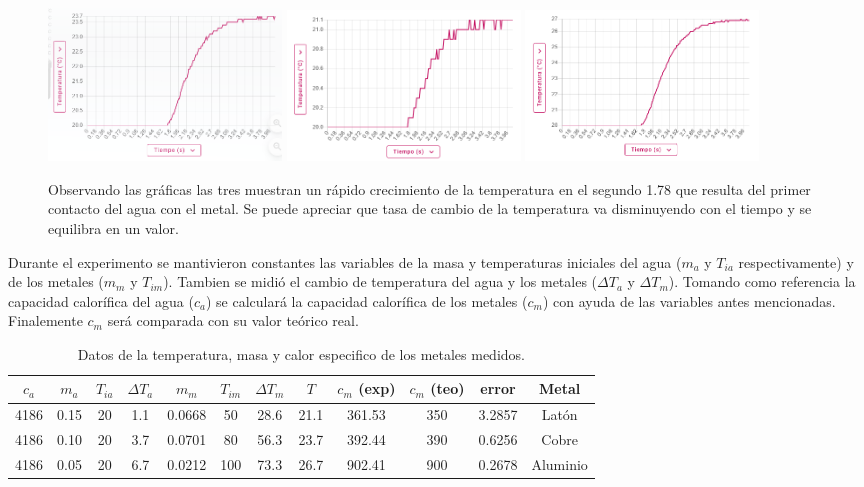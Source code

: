 \documentclass[a4paper,12pt]{article}
\begin{document}
\begin{figure}[h]

\centering
  {\includegraphics[width=0.3\textwidth]{imagenes/cobre.png}}
  \hfill
  {\includegraphics[width=0.3\textwidth]{imagenes/laton.png}}
  \hfill
  {\includegraphics[width=0.3\textwidth]{imagenes/aluminio.png}}
  \caption{Observando las gráficas las tres muestran un rápido crecimiento de la temperatura en el segundo 1.78 que resulta del primer contacto del agua con el metal. Se puede apreciar que tasa de cambio de la temperatura va disminuyendo con el tiempo y se equilibra en un valor.}
\end{figure}


Durante el experimento se mantivieron constantes las variables de la masa y temperaturas iniciales del agua ($m_{a}$ y $T_{ia}$ respectivamente) y de los metales ($m_{m}$ y $T_{im}$). Tambien se midió el cambio de temperatura del agua y los metales ($\Delta T_{a}$ y $\Delta T_{m}$). Tomando como referencia la capacidad calorífica del agua ($c_{a}$) se calculará la capacidad calorífica de los metales ($c_{m}$) con ayuda de las variables antes mencionadas. Finalemente $c_{m}$ será comparada con su valor teórico real. 



\begin{table}[h!]
\centering
 \begin{tabular}{||c c c c c c c c c c c c||} 
 \hline
 $c_{a}$ & $m_{a}$ & $T_{ia}$ & $\Delta T_{a}$ & $m_{m}$ & $T_{im}$ & $\Delta T_{m}$ & $T$ & $c_{m}$ (exp) & $c_{m}$ (teo) & error & Metal \\ [0.5ex] 
 \hline\hline
 4186 & 0.15 & 20 & 1.1 & 0.0668 & 50 & 28.6 & 21.1 & 361.53 & 350 & 3.2857 & Latón \\
 4186 & 0.10 & 20 & 3.7 & 0.0701 & 80 & 56.3 & 23.7 & 392.44 & 390 & 0.6256 & Cobre \\ 
 4186 & 0.05 & 20 & 6.7 & 0.0212 & 100 & 73.3 & 26.7 & 902.41 & 900 & 0.2678 & Aluminio \\[1ex] 
 \hline
 \end{tabular}
 \caption{Datos de la temperatura, masa y calor especifico de los metales medidos. }
\end{table}
\end{document}

